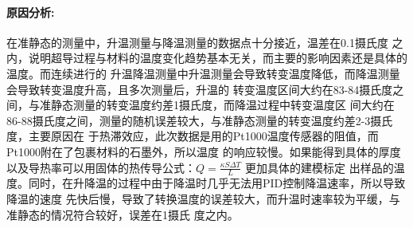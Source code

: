 \documentclass{ctexart}                                     %
\theoremstyle{ansstyle}
\begin{document}
\paragraph[short]{原因分析:}
在准静态的测量中，升温测量与降温测量的数据点十分接近，温差在0.1摄氏度
之内，说明超导过程与材料的温度变化趋势基本无关，而主要的影响因素还是具体的温度。而连续进行的
升温降温测量中升温测量会导致转变温度降低，而降温测量会导致转变温度升高，且多次测量后，升温的
转变温度区间大约在83-84摄氏度之间，与准静态测量的转变温度约差1摄氏度，而降温过程中转变温度区
间大约在86-88摄氏度之间，测量的随机误差较大，与准静态测量的转变温度约差2-3摄氏度，主要原因在
于热滞效应，此次数据是用的Pt1000温度传感器的阻值，而Pt1000附在了包裹材料的石墨外，所以温度
的响应较慢。如果能得到具体的厚度以及导热率可以用固体的热传导公式：$Q =\frac{\kappa S \Delta T}{L} $ 更加具体的建模标定
出样品的温度。同时，在升降温的过程中由于降温时几乎无法用PID控制降温速率，所以导致降温的速度
先快后慢，导致了转换温度的误差较大，而升温时速率较为平缓，与准静态的情况符合较好，误差在1摄氏
度之内。
\end{document}
